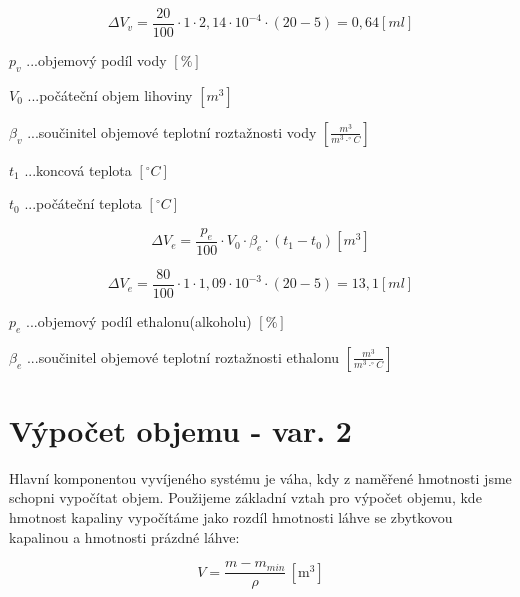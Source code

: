 \[\Delta V_v = \frac{20}{100} \cdot 1 \cdot  2,14 \cdot 10^{-4} \cdot (20 - 5) = 0,64 \left[ml\right]\]

\(p_v\) ...objemový podíl vody \([\%]\) 

\(V_0\) ...počáteční objem lihoviny \([m^3]\)

\(\beta_v\) ...součinitel objemové teplotní roztažnosti vody \([\frac{m^3}{m^3 \cdot ^\circ C}]\)

\(t_1\) ...koncová teplota \([^\circ C]\)

\(t_0\) ...počáteční teplota \([^\circ C]\)

\begin{equation}
    \Delta V_e = \frac{p_e}{100} \cdot V_0 \cdot \beta_e \cdot (t_1 - t_0)\left[m^3\right] \label{objem_kapalina}
\end{equation}

\[\Delta V_e = \frac{80}{100} \cdot 1 \cdot  1,09 \cdot 10^{-3} \cdot (20 - 5) = 13,1 \left[ml\right]\]

\(p_e\) ...objemový podíl ethalonu(alkoholu) \([\%]\) 

\(\beta_e\) ...součinitel objemové teplotní roztažnosti ethalonu \([\frac{m^3}{m^3 \cdot ^\circ C}]\)







\chapter*{Výpočet objemu - var. 2}
Hlavní komponentou vyvíjeného systému je váha, kdy z naměřené hmotnosti jsme schopni vypočítat objem. Použijeme základní vztah pro výpočet objemu, kde hmotnost kapaliny vypočítáme jako rozdíl hmotnosti láhve se zbytkovou kapalinou a hmotnosti prázdné láhve:

\begin{equation}
    V = \frac{m - m_{min}}{\rho} \, \left[\mathrm{m^3}\right] \label{objem_kapalina}
\end{equation}

